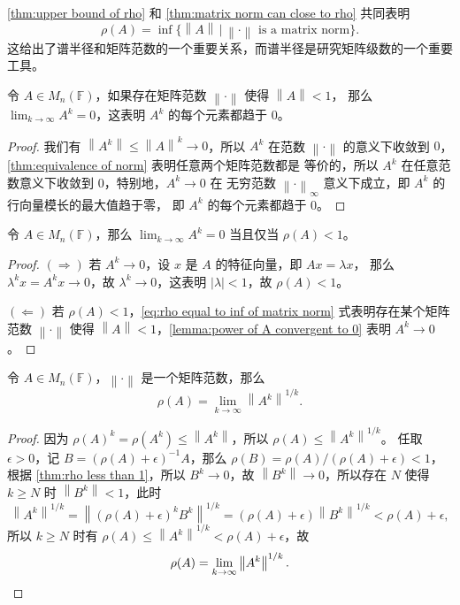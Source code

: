 \documentclass[fontset=none,zihao=-4]{Notes}
\newcommand{\norm}[1]{\left\lVert#1\right\rVert}
\begin{document}
\autoref{thm:upper bound of rho} 和 \autoref{thm:matrix norm can close to rho} 共同表明
\begin{equation}\label{eq:rho equal to inf of matrix norm}
  \rho(A)=\inf\{\norm{A}\,|\, \text{$\norm{\cdot}$ is a matrix norm}\}  .
\end{equation}
这给出了谱半径和矩阵范数的一个重要关系，而谱半径是研究矩阵级数的一个重要工具。

\begin{lemma}\label{lemma:power of A convergent to 0}
  令 $A\in M_n(\mathbb{F})$，如果存在矩阵范数 $\norm{\cdot}$ 使得 $\norm{A}< 1$，
  那么 $\lim_{k\to\infty} A^k=0$，这表明 $A^k$ 的每个元素都趋于 $0$。
\end{lemma}
\begin{proof}
  我们有 $\norm{A^k}\leq\norm{A}^k\to 0$，所以 $A^k$ 在范数 $\norm{\cdot}$
  的意义下收敛到 $0$，\autoref{thm:equivalence of norm} 表明任意两个矩阵范数都是
  等价的，所以 $A^k$ 在任意范数意义下收敛到 $0$，特别地，$A^k\to 0$ 在
  无穷范数 $\norm{\cdot}_\infty$ 意义下成立，即 $A^k$ 的行向量模长的最大值趋于零，
  即 $A^k$ 的每个元素都趋于 $0$。
\end{proof}

\begin{theorem}\label{thm:rho less than 1}
  令 $A\in M_n(\mathbb{F})$，那么 $\lim_{k\to\infty} A^k=0$ 当且仅当
  $\rho(A)<1$。
\end{theorem}
\begin{proof}
  $(\Rightarrow)$ 若 $A^k\to 0$，设 $x$ 是 $A$ 的特征向量，即 $Ax=\lambda x$，
  那么 $\lambda^k x=A^kx\to 0$，故 $\lambda^k\to 0$，这表明 $|\lambda|<1$，故
  $\rho(A)<1$。

  $(\Leftarrow)$ 若 $\rho(A)<1$，\eqref{eq:rho equal to inf of matrix norm} 式表明存在某个矩阵范数 $\norm{\cdot}$ 使得
  $\norm{A}<1$，\autoref{lemma:power of A convergent to 0} 表明 
  $A^k\to 0$。
\end{proof}

\begin{corollary}[Gelfand]
  令 $A\in M_n(\mathbb{F})$，$\norm{\cdot}$ 是一个矩阵范数，那么
  \[
    \rho(A)=\lim_{k\to\infty}\norm{A^k}^{1/k}.  
  \]
\end{corollary}
\begin{proof}
  因为 $\rho(A)^k=\rho(A^k)\leq \norm{A^k}$，所以 $\rho(A)\leq \norm{A^k}^{1/k}$。
  任取 $\epsilon>0$，记 $B=(\rho(A)+\epsilon)^{-1}A$，那么 $\rho(B)=\rho(A)/(\rho(A)+\epsilon)<1$，
  根据 \autoref{thm:rho less than 1}，所以 $B^k\to 0$，故 $\norm{B^k}\to 0$，所以存在
  $N$ 使得 $k\geq N$ 时 $\norm{B^k}<1$，此时
  \[
    \norm{A^k}^{1/k}=\norm{(\rho(A)+\epsilon)^kB^k}^{1/k}
    =(\rho(A)+\epsilon)\norm{B^k}^{1/k} <\rho(A)+\epsilon,
  \]
  所以 $k\geq N$ 时有 $\rho(A)\leq\norm{A^k}^{1/k}<\rho(A)+\epsilon$，故
  \[
    \rho(A)=\lim_{k\to\infty}\norm{A^k}^{1/k}.  \qedhere
  \]
\end{proof}
\end{document}
